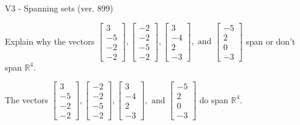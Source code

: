 \begin{exercise}
  \begin{exerciseTitle}V3 - Spanning sets (ver. 899)\end{exerciseTitle}
  \begin{exerciseStatement}
    Explain why the vectors \(\left[\begin{array}{r}
3 \\
-5 \\
-2 \\
-2
\end{array}\right] , \left[\begin{array}{r}
-2 \\
-2 \\
-5 \\
-2
\end{array}\right] , \left[\begin{array}{r}
3 \\
-4 \\
2 \\
-3
\end{array}\right] , \text{ and } \left[\begin{array}{r}
-5 \\
2 \\
0 \\
-3
\end{array}\right]\) span or don't span \(\mathbb{R}^4\). 
	


  \end{exerciseStatement}
  \begin{exerciseAnswer}
   The vectors \(\left[\begin{array}{r}
3 \\
-5 \\
-2 \\
-2
\end{array}\right] , \left[\begin{array}{r}
-2 \\
-2 \\
-5 \\
-2
\end{array}\right] , \left[\begin{array}{r}
3 \\
-4 \\
2 \\
-3
\end{array}\right] , \text{ and } \left[\begin{array}{r}
-5 \\
2 \\
0 \\
-3
\end{array}\right]\) 
  	 do  
	span \(\mathbb{R}^4\).
  


  \end{exerciseAnswer}
\end{exercise}